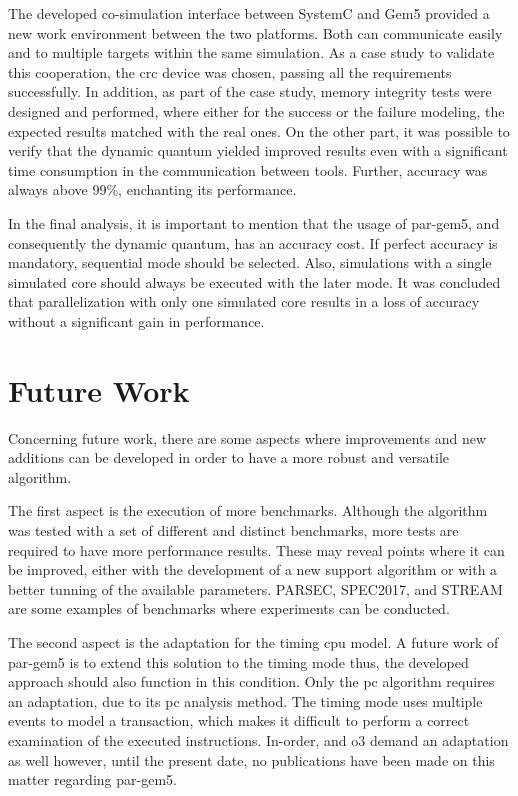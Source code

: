 The developed co-simulation interface between SystemC and Gem5 provided a new work environment between the two platforms. Both can communicate
easily and to multiple targets within the same simulation. As a case study to validate this cooperation, the \gls{crc} device was chosen, 
passing all the requirements successfully. In addition, as part of the case study, 
memory integrity tests were designed and performed, where either for the success or the failure modeling, the expected results matched
with the real ones. On the other part, it was possible to verify that the dynamic quantum yielded improved results even with a significant 
time consumption in the communication between tools. Further, accuracy was always above 99\%, enchanting its performance. 


In the final analysis, it is important to mention that the usage of par-gem5, and consequently the dynamic quantum, has an accuracy cost. If 
perfect accuracy is mandatory, sequential mode should be selected. Also, simulations with a single simulated core should always be 
executed with the later mode. It was concluded that parallelization with only one simulated core results in a loss of accuracy 
without a significant gain in performance.


\section{Future Work}

Concerning future work, there are some aspects where improvements and new additions can be developed in order to have a more robust 
and versatile algorithm.

The first aspect is the execution of more benchmarks. Although the algorithm was tested with a set of different and distinct benchmarks, 
more tests are required to have more performance results. These may reveal points where it can be improved, either with the development
of a new support algorithm or with a better tunning of the available parameters. PARSEC, SPEC2017, and STREAM are some examples of 
benchmarks where experiments can be conducted. 

The second aspect is the adaptation for the timing \gls{cpu} model. A future work of par-gem5 \cite{pargem5} is to extend this solution 
to the timing mode thus, the developed approach should also function in this condition. Only the \gls{pc} algorithm requires an 
adaptation, due to its \gls{pc} analysis method. The timing mode uses multiple events to model a transaction, which makes it difficult
to perform a correct examination of the executed instructions. In-order, and \gls{o3} demand an adaptation as well however, until 
the present date, no publications have been made on this matter regarding par-gem5.

